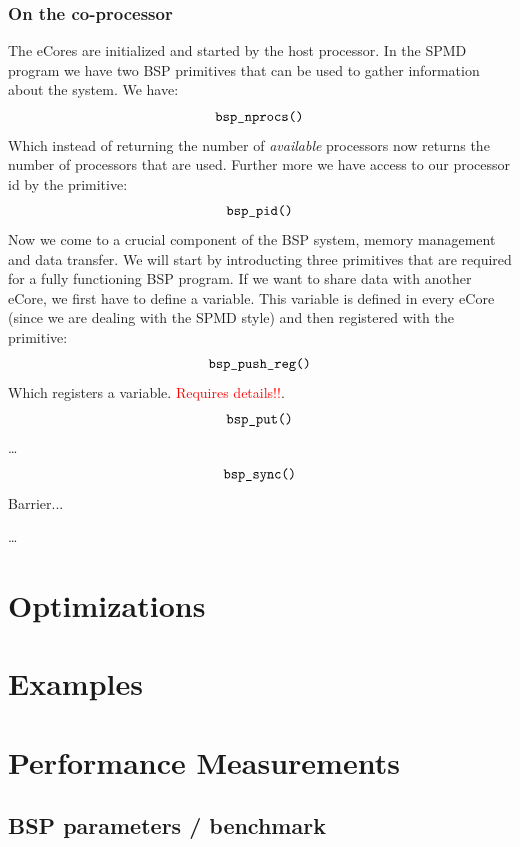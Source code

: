 \documentclass[fleqn]{article}
\renewcommand{\(}{\left(}
\renewcommand{\)}{\right)}
\newcommand{\todo}[1]{\textcolor{red}{#1}}
\begin{document}
\subsubsection{On the co-processor}

The eCores are initialized and started by the host processor. In the SPMD program we have two BSP primitives that can be used to gather information about the system. We have:
\begin{equation}
    \verb.bsp_nprocs(). 
\end{equation}
Which instead of returning the number of \emph{available} processors now returns the number of processors that are used. Further more we have access to our processor id by the primitive:
\begin{equation}
    \verb.bsp_pid(). 
\end{equation}
Now we come to a crucial component of the BSP system, memory management and data transfer. We will start by introducting three primitives that are required for a fully functioning BSP program. If we want to share data with another eCore, we first have to define a variable. This variable is defined in every eCore (since we are dealing with the SPMD style) and then registered with the primitive:
\begin{equation}
    \verb.bsp_push_reg(). 
\end{equation}
Which registers a variable. \todo{Requires details!!}.
\begin{equation}
    \verb.bsp_put(). 
\end{equation}
\ldots
\begin{equation}
    \verb.bsp_sync(). 
\end{equation}
Barrier...

\ldots

\section{Optimizations}

\section{Examples}

\section{Performance Measurements}

\subsection{BSP parameters / benchmark}
\end{document}
